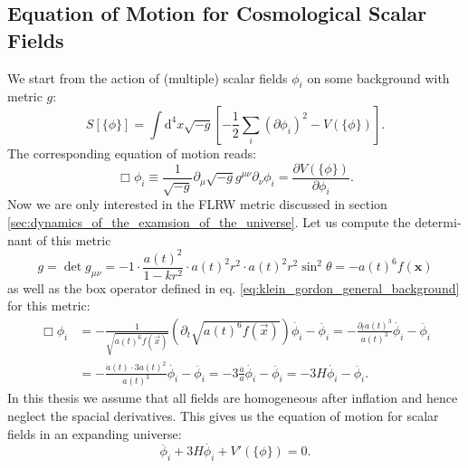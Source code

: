 \documentclass[master,       %
               twoside,        %
               BCOR10mm,       %
               english,ngerman, %
               ]{GAUBM}
\begin{document}
\begin{otherlanguage}{english}
\subsection{Equation of Motion for Cosmological Scalar Fields}
We start from the action of (multiple) scalar fields $\phi_i$ on some background with metric $g$:
\begin{equation}
	S[\{\phi\}] = \int \mathrm{d}^4 x \sqrt{-g} \left[- \frac{1}{2} \sum_i (\partial \phi_i)^2 - V(\{\phi\}) \right].
\end{equation}
The corresponding equation of motion reads:
\begin{equation}
	\label{eq:klein_gordon_general_background}
	\Box \phi_i \equiv \frac{1}{\sqrt{-g}} \partial_\mu \sqrt{-g} g^{\mu \nu} \partial_\nu \phi_i = \frac{\partial V(\{\phi\})}{\partial \phi_i}.
\end{equation}
Now we are only interested in the FLRW metric discussed in section \ref{sec:dynamics_of_the_examsion_of_the_universe}.
Let us compute the determinant of this metric
\begin{equation}
	g = \det g_{\mu \nu} = -1 \cdot \frac{a(t)^2}{1 - kr^2} \cdot a(t)^2 r^2 \cdot a(t)^2 r^2 \sin^2 \theta = - a(t)^6 f(\mathbf{x})
\end{equation}
as well as the box operator defined in eq. \eqref{eq:klein_gordon_general_background} for this metric:
\begin{align}
	    \Box \phi_i
	    &= - \frac{1}{\sqrt{a(t)^6 f(\vec{x})}} (\partial_t \sqrt{ a(t)^6 f(\vec{x}) }) \dot{\phi_i} - \ddot{\phi_i}
	    = - \frac{\partial_t a(t)^3}{a(t)^3} \dot{\phi_i} - \ddot{\phi_i} \nonumber \\
	    &= - \frac{\dot{a}(t) \cdot 3 a(t)^2}{a(t)^3} \dot{\phi_i} - \ddot{\phi_i}
	    = - 3 \frac{\dot{a}}{a} \dot{\phi_i} - \ddot{\phi_i}
	    = - 3H \dot{\phi_i} - \ddot{\phi_i}.
\end{align}
In this thesis we assume that all fields are homogeneous after inflation and hence neglect the spacial derivatives.
This gives us the equation of motion for scalar fields in an expanding universe:
\begin{equation}
	\label{eq:scalar_field_eom}
	\boxed{
	\ddot{\phi_i} + 3 H \dot{\phi_i} + V'(\{\phi\}) = 0.
	}
\end{equation}


\end{otherlanguage}
\end{document}
